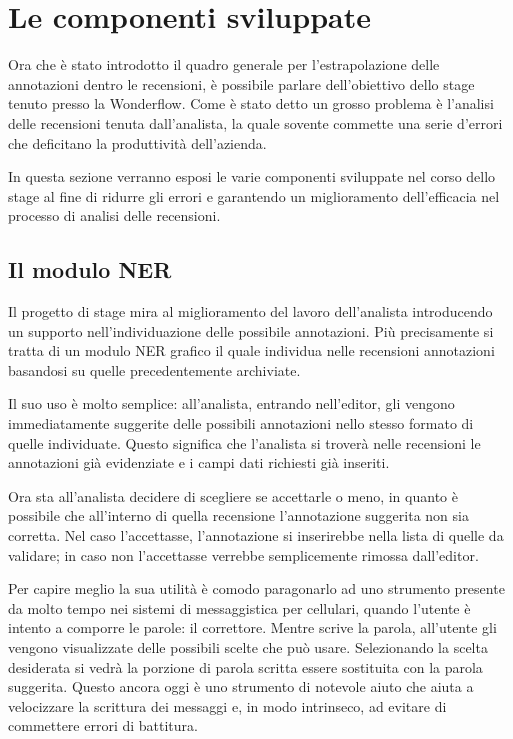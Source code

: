 \section{Le componenti sviluppate}
Ora che è stato introdotto il quadro generale per l'estrapolazione delle
annotazioni dentro le recensioni, è possibile parlare dell'obiettivo dello stage
tenuto presso la Wonderflow. Come è stato detto un grosso problema è l'analisi
delle recensioni tenuta dall'analista, la quale sovente commette una serie
d'errori che deficitano la produttività dell'azienda.

In questa sezione verranno esposi le varie componenti sviluppate nel corso dello
stage al fine di ridurre gli errori e garantendo un miglioramento dell'efficacia
nel processo di analisi delle recensioni.

\subsection{Il modulo NER}
Il progetto di stage mira al miglioramento del lavoro dell'analista introducendo
un supporto nell'individuazione delle possibile annotazioni. Più precisamente
si tratta di un modulo \gls{NER} grafico il quale individua nelle recensioni
annotazioni basandosi su quelle precedentemente archiviate.

Il suo uso è molto semplice: all'analista, entrando nell'editor, gli vengono
immediatamente suggerite delle possibili annotazioni nello stesso formato di
quelle individuate. Questo significa che l'analista si troverà nelle recensioni
le annotazioni già evidenziate e i campi dati richiesti già inseriti.

Ora sta all'analista decidere di scegliere se accettarle o meno, in quanto è
possibile che all'interno di quella recensione l'annotazione suggerita non sia
corretta. Nel caso l'accettasse, l'annotazione si inserirebbe nella lista di
quelle da validare; in caso non l'accettasse verrebbe semplicemente rimossa
dall'editor.

Per capire meglio la sua utilità è comodo paragonarlo ad uno strumento presente
da molto tempo nei sistemi di messaggistica per cellulari, quando l'utente è
intento a comporre le parole: il correttore. Mentre scrive la parola,
all'utente gli vengono visualizzate delle possibili scelte che può usare.
Selezionando la scelta desiderata si vedrà la porzione di parola scritta essere
sostituita con la parola suggerita. Questo ancora oggi è uno strumento di
notevole aiuto che aiuta a velocizzare la scrittura dei messaggi e, in modo
intrinseco, ad evitare di commettere errori di battitura.

